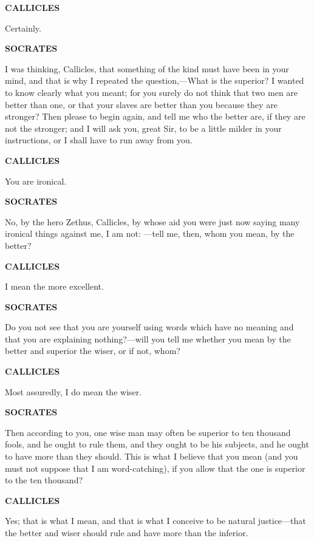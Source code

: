 \documentclass[11pt,letter]{article}
\begin{document}
\par \textbf{CALLICLES}
\par   Certainly.

\par \textbf{SOCRATES}
\par   I was thinking, Callicles, that something of the kind must have been in your mind, and that is why I repeated the question,—What is the superior? I wanted to know clearly what you meant; for you surely do not think that two men are better than one, or that your slaves are better than you because they are stronger? Then please to begin again, and tell me who the better are, if they are not the stronger; and I will ask you, great Sir, to be a little milder in your instructions, or I shall have to run away from you.

\par \textbf{CALLICLES}
\par   You are ironical.

\par \textbf{SOCRATES}
\par   No, by the hero Zethus, Callicles, by whose aid you were just now saying many ironical things against me, I am not: —tell me, then, whom you mean, by the better?

\par \textbf{CALLICLES}
\par   I mean the more excellent.

\par \textbf{SOCRATES}
\par   Do you not see that you are yourself using words which have no meaning and that you are explaining nothing?—will you tell me whether you mean by the better and superior the wiser, or if not, whom?

\par \textbf{CALLICLES}
\par   Most assuredly, I do mean the wiser.

\par \textbf{SOCRATES}
\par   Then according to you, one wise man may often be superior to ten thousand fools, and he ought to rule them, and they ought to be his subjects, and he ought to have more than they should. This is what I believe that you mean (and you must not suppose that I am word-catching), if you allow that the one is superior to the ten thousand?

\par \textbf{CALLICLES}
\par   Yes; that is what I mean, and that is what I conceive to be natural justice—that the better and wiser should rule and have more than the inferior.
\end{document}
